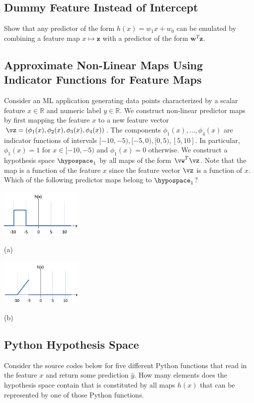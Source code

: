 \documentclass[12pt]{report}
\begin{document}
\subsection{Dummy Feature Instead of Intercept}
\label{sec_dummy_feature}
Show that any predictor of the form $h(x) = w_{1} x +w_{0}$ can be emulated by 
combining a feature map $x \mapsto \mathbf{z}$ with a predictor of the form $\mathbf{w}^{T} \mathbf{z}$. 

\subsection{Approximate Non-Linear Maps Using Indicator Functions for Feature Maps}
\label{ex_2_2}
Consider an ML application generating data points characterized by a scalar feature $x \in \mathbb{R}$ 
and numeric label $y \in \mathbb{R}$. We construct non-linear predictor maps by first mapping the 
feature $x$ to a new feature vector $\vz=(\phi_{1}(x),\phi_{2}(x),\phi_{3}(x),\phi_{4}(x))$. 
The components $\phi_{1}(x),\ldots,\phi_{4}(x)$ are indicator functions of intervals 
$[-10,-5), [-5,0),[0,5),[5,10]$. In particular, $\phi_{1}(x) = 1$ for $x \in [-10,-5)$ and $\phi_{1}(x)=0$ otherwise. 
We construct a hypothesis space $\hypospace_{1}$ by all maps of the form $\vw^{T}\vz$. 
Note that the map is a function of the feature $x$ since the feature vector $\vz$ is a function 
of $x$. Which of the following predictor maps belong to $\hypospace_{1}$?

\begin{minipage}{.5\textwidth} %
\includegraphics[width=4cm]{PiecewiseFun1.png}

(a)
\end{minipage} %
\begin{minipage}{.5\textwidth} %
	\includegraphics[width=4cm]{PiecewiseFun2.png}
	
(b)
\end{minipage}
 
 \subsection{Python Hypothesis Space}
 \label{ex_2_3}
 Consider the source codes below for five different Python functions that read 
 in the feature $x$ and return some prediction $\hat{y}$. How many elements 
 does the hypothesis space contain that is constituted by all maps $h(x)$ that 
 can be represented by one of those Python functions. 
 
\end{document}
